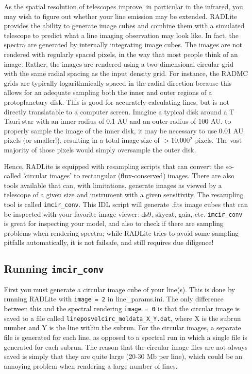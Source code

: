 \documentclass[11pt]{article}
\begin{document}
As the spatial resolution of telescopes improve, in particular in the infrared, you may wish to figure out whether your line emission
may be extended. RADLite provides the ability to generate image cubes and combine them with a simulated telescope to predict what a 
line imaging observation may look like. In fact, the spectra are generated by internally integrating image cubes. The images are
not rendered with regularly spaced pixels, in the way that most people think of an image. Rather, the images are rendered using a 
two-dimensional circular grid with the same radial spacing as the input density grid. For instance, the RADMC grids are typically
logarithmically spaced in the radial direction because this allows for an adequate sampling both the inner and outer regions of a 
protoplanetary disk. This is good for accurately calculating lines, but is not directly translatable to a computer screen. Imagine a typical disk around
a T Tauri star with an inner radius of 0.1 AU and an outer radius of 100 AU. to properly sample the image of the inner disk, it may be necessary to
use 0.01 AU pixels (or smaller!), resulting in a total image size of $>$10,000$^2$ pixels. The vast majority of those pixels would simply oversample
the outer disk. 

Hence, RADLite is equipped with resampling scripts that can convert the so-called 'circular images' to rectangular (flux-conserved) images.
There are also tools available that can, with limitations, generate images as viewed by a telescope of a given size and instrument with a given 
sensitivity. The resampling tool is called {\tt imcir\_conv}. This IDL script will generate .fits image cubes that can be inspected
with your favorite image viewer: ds9, skycat, gaia, etc. {\tt imcir\_conv} is great for inspecting your model, and also to check if there are
sampling problems when rendering spectra; while RADLite tries to avoid some sampling pitfalls automatically, it is not failsafe, 
and still requires due diligence! 

\subsection{Running {\tt imcir\_conv}}

First you must generate a circular image cube of your line(s). This is done by running RADLite with {\tt image = 2} in line\_params.ini. The
only difference between this and the spectral rendering {\tt image = 0} is that the circular image is saved to a file called 
{\tt lineposvelcirc\_moldata\_X\_Y.dat}, where X is the subrun number and Y is the line within the subrun. For the circular images, 
a separate file is generated for each line, as opposed to a spectral run in which a single file is generated for each subrun. The reason that the
circular image files are not always saved is simply that they are quite large (20-30 Mb per line), which could be an annoying 
problem when rendering a large number of lines.  
\end{document}
